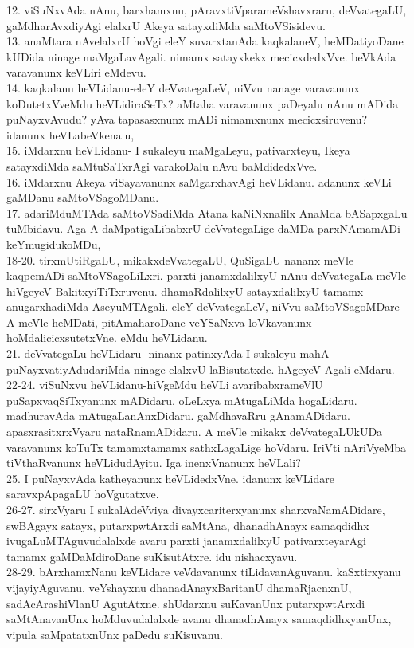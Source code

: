 \documentclass{article}
\begin{document}
12. viSuNxvAda nAnu, barxhamxnu, pAravxtiVparameVshavxraru, deVvategaLU, gaMdharAvxdiyAgi elalxrU Akeya satayxdiMda saMtoVSisidevu.\\
13. anaMtara nAvelalxrU hoVgi eleY suvarxtanAda kaqkalaneV, heMDatiyoDane kUDida ninage maMgaLavAgali. nimamx satayxkekx mecicxdedxVve. beVkAda varavanunx keVLiri eMdevu.\\
14. kaqkalanu heVLidanu-eleY deVvategaLeV, niVvu nanage varavanunx koDutetxVveMdu heVLidiraSeTx? aMtaha varavanunx paDeyalu nAnu mADida puNayxvAvudu? yAva tapasasxnunx mADi nimamxnunx mecicxsiruvenu? idanunx heVLabeVkenalu,\\
15. iMdarxnu heVLidanu- I sukaleyu maMgaLeyu, pativarxteyu, Ikeya satayxdiMda saMtuSaTxrAgi varakoDalu nAvu baMdidedxVve.\\
16. iMdarxnu Akeya viSayavanunx saMgarxhavAgi heVLidanu. adanunx keVLi gaMDanu saMtoVSagoMDanu.\\
17. adariMduMTAda saMtoVSadiMda Atana kaNiNxnalilx AnaMda bASapxgaLu tuMbidavu. Aga A daMpatigaLibabxrU deVvategaLige daMDa parxNAmamADi keYmugidukoMDu,\\
18-20. tirxmUtiRgaLU, mikakxdeVvategaLU, QuSigaLU nananx meVle kaqpemADi saMtoVSagoLiLxri. parxti janamxdalilxyU nAnu deVvategaLa meVle hiVgeyeV BakitxyiTiTxruvenu. dhamaRdalilxyU satayxdalilxyU tamamx anugarxhadiMda AseyuMTAgali. eleY deVvategaLeV, niVvu saMtoVSagoMDare A meVle heMDati, pitAmaharoDane veYSaNxva loVkavanunx hoMdalicicxsutetxVne. eMdu heVLidanu.\\
21. deVvategaLu heVLidaru- ninanx patinxyAda I sukaleyu mahA puNayxvatiyAdudariMda ninage elalxvU laBisutatxde. hAgeyeV Agali eMdaru.\\
22-24. viSuNxvu heVLidanu-hiVgeMdu heVLi avaribabxrameVlU puSapxvaqSiTxyanunx mADidaru. oLeLxya mAtugaLiMda hogaLidaru. madhuravAda mAtugaLanAnxDidaru. gaMdhavaRru gAnamADidaru. apasxrasitxrxVyaru nataRnamADidaru. A meVle mikakx deVvategaLUkUDa varavanunx koTuTx tamamxtamamx sathxLagaLige hoVdaru. IriVti nAriVyeMba tiVthaRvanunx heVLidudAyitu. Iga inenxVnanunx heVLali?\\
25. I puNayxvAda katheyanunx heVLidedxVne. idanunx keVLidare saravxpApagaLU hoVgutatxve.\\
26-27. sirxVyaru I sukalAdeVviya divayxcariterxyanunx sharxvaNamADidare, swBAgayx satayx, putarxpwtArxdi saMtAna, dhanadhAnayx samaqdidhx ivugaLuMTAguvudalalxde avaru parxti janamxdalilxyU pativarxteyarAgi tamamx gaMDaMdiroDane suKisutAtxre. idu nishacxyavu.\\
28-29. bArxhamxNanu keVLidare veVdavanunx tiLidavanAguvanu. kaSxtirxyanu vijayiyAguvanu. veYshayxnu dhanadAnayxBaritanU dhamaRjacnxnU, sadAcArashiVlanU AgutAtxne. shUdarxnu suKavanUnx putarxpwtArxdi saMtAnavanUnx hoMduvudalalxde avanu dhanadhAnayx samaqdidhxyanUnx, vipula saMpatatxnUnx paDedu suKisuvanu.\\
\end{document}
